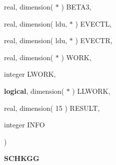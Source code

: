 {\begin{DoxyParamCaption}
\item[{real, dimension( $\ast$ )}]{B\+E\+T\+A3, }
\item[{real, dimension( ldu, $\ast$ )}]{E\+V\+E\+C\+T\+L, }
\item[{real, dimension( ldu, $\ast$ )}]{E\+V\+E\+C\+T\+R, }
\item[{real, dimension( $\ast$ )}]{W\+O\+R\+K, }
\item[{integer}]{L\+W\+O\+R\+K, }
\item[{{\bf logical}, dimension( $\ast$ )}]{L\+L\+W\+O\+R\+K, }
\item[{real, dimension( 15 )}]{R\+E\+S\+U\+L\+T, }
\item[{integer}]{I\+N\+F\+O}
\end{DoxyParamCaption}
)}\label{group__single__eig_ga9f423a19ff92049fe736bf71a7bfa7c7}


{\bfseries S\+C\+H\+K\+G\+G} 

